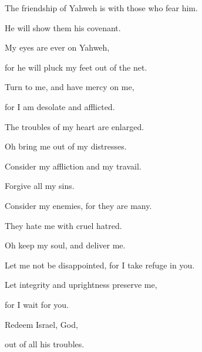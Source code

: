 {\par }{\Q {}The friendship of Yahweh is with those who fear him.
\par }{\QB He will show them his covenant.
\par }{\BB \par }{\Q {}My eyes are ever on Yahweh,
\par }{\QB for he will pluck my feet out of the net.
\par }{\Q {}Turn to me, and have mercy on me,
\par }{\QB for I am desolate and afflicted.
\par }{\Q {}The troubles of my heart are enlarged.
\par }{\QB Oh bring me out of my distresses.
\par }{\Q {}Consider my affliction and my travail.
\par }{\QB Forgive all my sins.
\par }{\Q {}Consider my enemies, for they are many.
\par }{\QB They hate me with cruel hatred.
\par }{\Q {}Oh keep my soul, and deliver me.
\par }{\QB Let me not be disappointed, for I take refuge in you.
\par }{\Q {}Let integrity and uprightness preserve me,
\par }{\QB for I wait for you.
\par }{\Q {}Redeem Israel, God,
\par }{\QB out of all his troubles.

}
